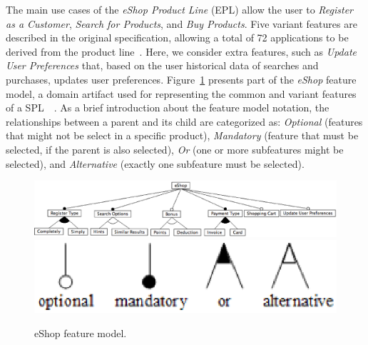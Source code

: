 The main use cases of the \emph{eShop Product Line} (EPL) 
allow the user to \emph{Register as a Customer}, \emph{Search for Products}, 
and \emph{Buy Products}.  Five variant features are described in the original specification,
allowing a total  of 72 applications to be derived from the product line~\cite{eshop-url}. Here, 
we consider extra features, such as \emph{Update User Preferences} that, based on the user historical data of searches 
and purchases, updates user preferences. Figure~\ref{fig:eshop-fm} presents part of the \emph{eShop} feature model, a 
domain artifact used for representing the common and variant features of a SPL~~\cite{gheyi-alloy-06,czarnecki-book,kang-foda-report}. 
As a brief introduction about the feature model notation, the relationships between a parent and its child are 
categorized as: \emph{Optional} (features that might not be select in a specific product), \emph{Mandatory} (feature that must be selected, if the parent is also 
selected), \emph{Or} (one or more subfeatures might be selected), and \emph{Alternative} (exactly one subfeature must be selected).     

 \begin{figure}[h]
 \begin{center}
  \includegraphics[scale=0.35]{img/eShop-fm3.eps}
   \includegraphics[scale=0.35]{img/fm-notation.eps}
  \caption{eShop feature model.}
  \label{fig:eshop-fm}
  \end{center}
\end{figure}



